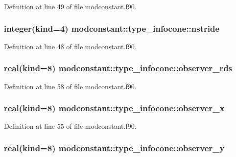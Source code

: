 Definition at line 49 of file modconstant.\-f90.

\hypertarget{structmodconstant_1_1type__infocone_a0518cd3191a67331de40dd13f19345b0}{
\subsubsection[{nstride}]{\setlength{\rightskip}{0pt plus 5cm}integer(kind=4) modconstant\-::type\-\_\-infocone\-::nstride}}\label{structmodconstant_1_1type__infocone_a0518cd3191a67331de40dd13f19345b0}


Definition at line 48 of file modconstant.\-f90.

\hypertarget{structmodconstant_1_1type__infocone_a5ce5f0baded3372b6802b32a689cf571}{
\subsubsection[{observer\-\_\-rds}]{\setlength{\rightskip}{0pt plus 5cm}real(kind=8) modconstant\-::type\-\_\-infocone\-::observer\-\_\-rds}}\label{structmodconstant_1_1type__infocone_a5ce5f0baded3372b6802b32a689cf571}


Definition at line 58 of file modconstant.\-f90.

\hypertarget{structmodconstant_1_1type__infocone_af67a9e1949f9edead87e1c7bce004c5c}{
\subsubsection[{observer\-\_\-x}]{\setlength{\rightskip}{0pt plus 5cm}real(kind=8) modconstant\-::type\-\_\-infocone\-::observer\-\_\-x}}\label{structmodconstant_1_1type__infocone_af67a9e1949f9edead87e1c7bce004c5c}


Definition at line 55 of file modconstant.\-f90.

\hypertarget{structmodconstant_1_1type__infocone_a2b4f02168657948cb408c35f98263029}{
\subsubsection[{observer\-\_\-y}]{\setlength{\rightskip}{0pt plus 5cm}real(kind=8) modconstant\-::type\-\_\-infocone\-::observer\-\_\-y}}\label{structmodconstant_1_1type__infocone_a2b4f02168657948cb408c35f98263029}


